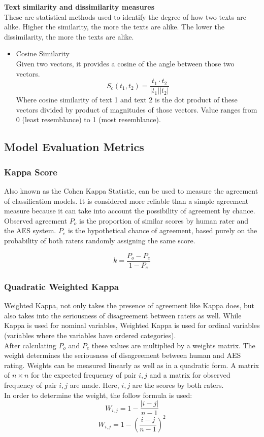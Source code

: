 \documentclass{article}
\begin{document}
	\textbf{Text similarity and dissimilarity measures} \\
	These are statistical methods used to identify the degree of how two texts are alike. Higher the similarity, the more the texts are alike. The lower the dissimilarity, the more the texts are alike.
	\begin{itemize}
		\item Cosine Similarity \\ Given two vectors, it provides a cosine of the angle between those two vectors.
		$$S_c (t_1, t_2) = \frac{t_1 \cdot t_2}{|t_1||t_2|}$$ Where cosine similarity of text 1 and text 2 is the dot product of these vectors divided by product of magnitudes of those vectors. Value ranges from 0 (least resemblance) to 1 (most resemblance).
	\end{itemize}
	
	\subsection{Model Evaluation Metrics} 
	\subsubsection*{Kappa Score}
	Also known as the Cohen Kappa Statistic, can be used to measure the agreement of classification models. It is considered more reliable than a simple agreement measure because it can take into account the possibility of agreement by chance. \\ Observed agreement $P_o$ is the proportion of similar scores by human rater and the AES system. $P_e$ is the hypothetical chance of agreement, based purely on the probability of both raters randomly assigning the same score. 
	
	$$k = \frac{P_o - P_e}{1 - P_e}$$
	
	\subsubsection*{Quadratic Weighted Kappa}
	Weighted Kappa, not only takes the presence of agreement like Kappa does, but also takes into the seriousness of disagreement between raters as well. While Kappa is used for nominal variables, Weighted Kappa is used for ordinal variables (variables where the variables have ordered categories). \\
	After calculating $P_o$ and $P_e$ these values are multiplied by a weights matrix. The weight determines the seriousness of disagreement between human and AES rating. Weights can be measured linearly as well as in a quadratic form. A matrix of $n \times n$ for the expected frequency of pair ${i, j}$ and a matrix for observed frequency of pair $i, j$ are made. Here, $i, j$ are the scores by both raters. \\
	In order to determine the weight, the follow formula is used:
	$$W_{i, j} = 1 - \frac{|i - j|}{n - 1}$$
	$$W_{i, j} = 1 - \left( \frac{i - j}{n - 1} \right) ^2$$
	
\end{document}
